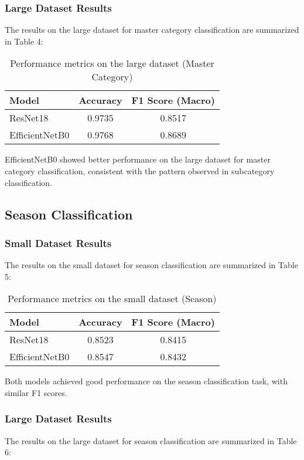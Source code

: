 \documentclass[10pt,journal,compsoc]{IEEEtran}
\begin{document}
\subsubsection{Large Dataset Results}
The results on the large dataset for master category classification are summarized in Table 4:

\begin{table}[htbp]
\centering
\caption{Performance metrics on the large dataset (Master Category)}
\begin{tabular}{|l|c|c|}
\hline
\textbf{Model} & \textbf{Accuracy} & \textbf{F1 Score (Macro)} \\
\hline
ResNet18 & 0.9735 & 0.8517 \\
\hline
EfficientNetB0 & 0.9768 & 0.8689 \\
\hline
\end{tabular}
\end{table}

EfficientNetB0 showed better performance on the large dataset for master category classification, consistent with the pattern observed in subcategory classification.

\subsection{Season Classification}

\subsubsection{Small Dataset Results}
The results on the small dataset for season classification are summarized in Table 5:

\begin{table}[htbp]
\centering
\caption{Performance metrics on the small dataset (Season)}
\begin{tabular}{|l|c|c|}
\hline
\textbf{Model} & \textbf{Accuracy} & \textbf{F1 Score (Macro)} \\
\hline
ResNet18 & 0.8523 & 0.8415 \\
\hline
EfficientNetB0 & 0.8547 & 0.8432 \\
\hline
\end{tabular}
\end{table}

Both models achieved good performance on the season classification task, with similar F1 scores.

\subsubsection{Large Dataset Results}
The results on the large dataset for season classification are summarized in Table 6:
\end{document}
